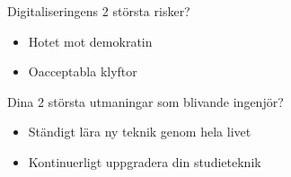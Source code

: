 \documentclass{lecturesimple}
\begin{document}
\begin{Slide}{Digitaliseringens 2 största risker?}
  \begin{itemize}
    \item Hotet mot demokratin
    \item Oacceptabla klyftor
  \end{itemize}  
\end{Slide}

\begin{Slide}{Dina 2 största utmaningar som blivande ingenjör?}
  \begin{itemize}
    \item Ständigt lära ny teknik genom hela livet 
    \item Kontinuerligt uppgradera din studieteknik
  \end{itemize}  
\end{Slide}


{
}
\end{document}
